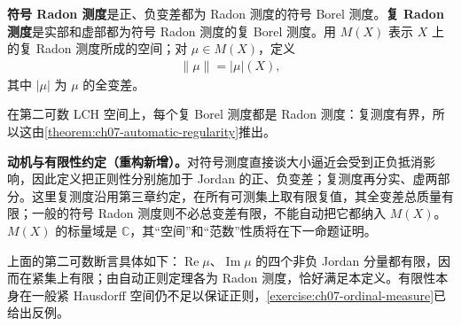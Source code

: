 \documentclass[../../main.tex]{subfiles}
\begin{document}
\begin{definition}\label{definition:ch07-signed-complex-radon}
\textbf{符号 Radon 测度}是正、负变差都为 Radon 测度的符号 Borel 测度。\textbf{复 Radon 测度}是实部和虚部都为符号 Radon 测度的复 Borel 测度。用 $M(X)$ 表示 $X$ 上的复 Radon 测度所成的空间；对 $\mu\in M(X)$，定义
\begin{align*}
\|\mu\|=|\mu|(X),
\end{align*}
其中 $|\mu|$ 为 $\mu$ 的全变差。
\end{definition}
在第二可数 LCH 空间上，每个复 Borel 测度都是 Radon 测度：复测度有界，所以这由\cref{theorem:ch07-automatic-regularity}推出。
\begin{remark}
\textbf{动机与有限性约定（重构新增）。}对符号测度直接谈大小逼近会受到正负抵消影响，因此定义把正则性分别施加于 Jordan 的正、负变差；复测度再分实、虚两部分。这里复测度沿用第三章约定，在所有可测集上取有限复值，其全变差总质量有限；一般的符号 Radon 测度则不必总变差有限，不能自动把它都纳入 $M(X)$。$M(X)$ 的标量域是 $\mathbb C$，其“空间”和“范数”性质将在下一命题证明。

上面的第二可数断言具体如下：$\operatorname{Re}\mu$、$\operatorname{Im}\mu$ 的四个非负 Jordan 分量都有限，因而在紧集上有限；由自动正则定理各为 Radon 测度，恰好满足本定义。有限性本身在一般紧 Hausdorff 空间仍不足以保证正则，\cref{exercise:ch07-ordinal-measure}已给出反例。
\end{remark}
\end{document}
